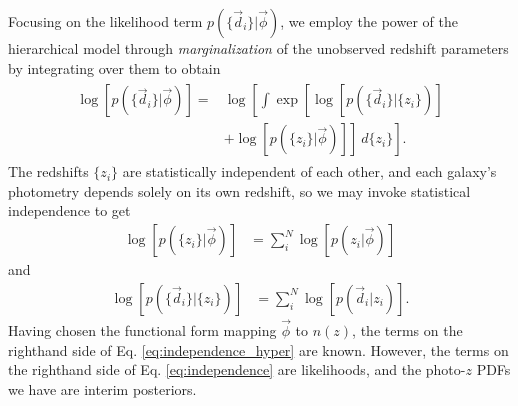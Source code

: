 \documentclass[iop]{emulateapj}
\begin{document}
Focusing on the likelihood term $p(\{\vec{d}_{i}\} | \vec{\phi})$, we employ the power of the hierarchical model through \textit{marginalization} of the unobserved redshift parameters by integrating over them to obtain 
\begin{align}
\label{eq:marginalize}
\begin{split}
\log[p(\{\vec{d}_{i}\} | \vec{\phi})] = & \log\left[\int\exp\left[\log[p(\{\vec{d}_{i}\} | \{z_{i}\})]\right.\right. \\
& \left.\left.+ \log[p(\{z_{i}\} | \vec{\phi})]\right]\ d\{z_{i}\}\right] .
\end{split}
\end{align}
The redshifts $\{z_{i}\}$ are statistically independent of each other, and each galaxy's photometry depends solely on its own redshift, so we may invoke statistical independence to get
\begin{align}
\label{eq:independence_hyper}
\log[p(\{z_{i}\} | \vec{\phi})] &= \sum_{i}^{N} \log[p(z_{i} | \vec{\phi})]
\end{align}
and
\begin{align}
\label{eq:independence}
\log[p(\{\vec{d}_{i}\} | \{z_{i}\})] &= \sum_{i}^{N} \log[p(\vec{d}_{i} | z_{i})] .
\end{align}
Having chosen the functional form mapping $\vec{\phi}$ to $n(z)$, the terms on the righthand side of Eq. \ref{eq:independence_hyper} are known.  However, the terms on the righthand side of Eq. \ref{eq:independence} are likelihoods, and the photo-$z$ PDFs we have are interim posteriors.
\end{document}
